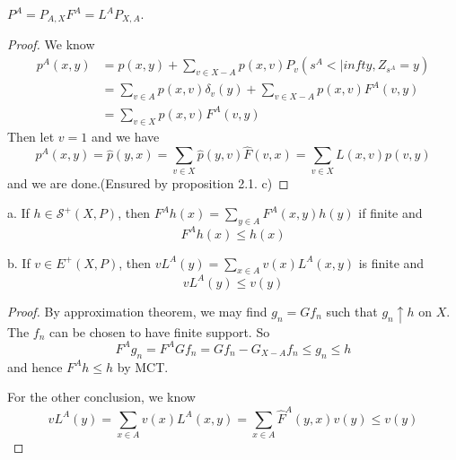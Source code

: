 \documentclass[lang=en, color=blue, ]{elegantbook}
\newcommand{\Sar}{\mathcal{S}}
\begin{document}
\begin{lemma}
    $P^A = P_{A,X}F^A = L^AP_{X,A}$.
\end{lemma}
\begin{proof}
    We know
    \[
    \begin{aligned}
        p^A(x,y) &= p(x,y) + \sum_{v\in X-A}p(x,v)P_v(s^A<|infty, Z_{s^A} = y) \\
        &=\sum\limits_{v\in A}p(x,v)\delta_v(y) + \sum\limits_{v\in X-A}p(x,v)F^A(v,y) \\
        &= \sum\limits_{v\in X}p(x,v)F^A(v,y)
    \end{aligned}
    \]
    Then let $v = 1$ and we have
    \[
    p^A(x,y) = \hat{p}(y,x) = \sum_{v\in X}\hat{p}(y,v)\hat{F}(v,x) = \sum\limits_{v\in X} L(x,v)p(v,y) 
    \]
    and we are done.(Ensured by proposition 2.1. c)
\end{proof}

\begin{lemma}
    a. If $h\in\Sar^+(X,P)$, then $F^Ah(x) = \sum_{y\in A} F^A(x,y)h(y)$ if finite and
    \[F^Ah(x) \leq h(x)\]\par
    b. If $v\in E^+(X,P)$, then $vL^A(y) = \sum_{x\in A}v(x)L^A(x,y)$ is finite and
    \[vL^A(y) \leq v(y)\]
\end{lemma}
\begin{proof}
    By approximation theorem, we may find $g_n = Gf_n$ such that $g_n \uparrow h$ on $X$. The $f_n$ can be chosen to have finite support. So
    \[
    F^Ag_n = F^AGf_n = Gf_n - G_{X-A}f_n \leq g_n \leq h
    \]
    and hence $F^Ah \leq h$ by MCT.\par
    For the other conclusion, we know 
    \[
    vL^A(y) = \sum_{x\in A}v(x)L^A(x,y) = \sum_{x\in A}\hat{F}^A(y,x)v(y) \leq v(y)
    \]
\end{proof}
\end{document}

